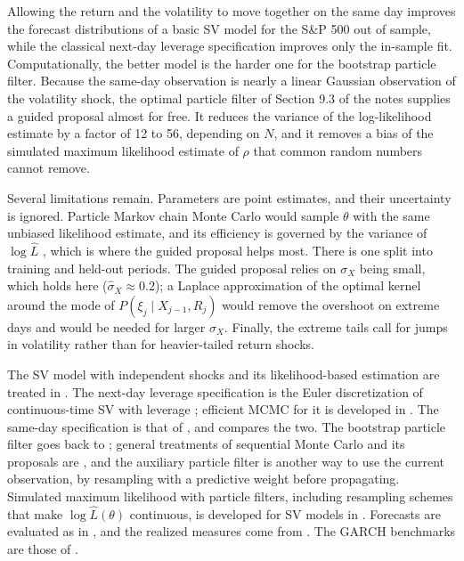 Allowing the return and the volatility to move together on the same day improves the forecast distributions of a basic SV model for the S\&P 500 out of sample, while the classical next-day leverage specification improves only the in-sample fit. Computationally, the better model is the harder one for the bootstrap particle filter. Because the same-day observation is nearly a linear Gaussian observation of the volatility shock, the optimal particle filter of Section 9.3 of the notes supplies a guided proposal almost for free. It reduces the variance of the log-likelihood estimate by a factor of 12 to 56, depending on $N$, and it removes a bias of the simulated maximum likelihood estimate of $\rho$ that common random numbers cannot remove.

Several limitations remain. Parameters are point estimates, and their uncertainty is ignored. Particle Markov chain Monte Carlo \cite{andrieuEtAl2010} would sample $\theta$ with the same unbiased likelihood estimate, and its efficiency is governed by the variance of $\log\hat L$ \cite{doucetEtAl2015}, which is where the guided proposal helps most. There is one split into training and held-out periods. The guided proposal relies on $\sigma_X$ being small, which holds here ($\hat\sigma_X \approx 0.2$); a Laplace approximation of the optimal kernel around the mode of $P(\xi_j \mid X_{j-1}, R_j)$ would remove the overshoot on extreme days and would be needed for larger $\sigma_X$. Finally, the extreme tails call for jumps in volatility rather than for heavier-tailed return shocks.

The SV model with independent shocks and its likelihood-based estimation are treated in \cite{kimShephardChib1998}. The next-day leverage specification is the Euler discretization of continuous-time SV with leverage \cite{harveyShephard1996, yu2005}; efficient MCMC for it is developed in \cite{omoriEtAl2007}. The same-day specification is that of \cite{jacquierPolsonRossi2004}, and \cite{yu2005} compares the two. The bootstrap particle filter goes back to \cite{gordonEtAl1993}; general treatments of sequential Monte Carlo and its proposals are \cite{doucetGodsillAndrieu2000, delMoral2004, chopinPapaspiliopoulos2020}, and the auxiliary particle filter \cite{pittShephard1999} is another way to use the current observation, by resampling with a predictive weight before propagating. Simulated maximum likelihood with particle filters, including resampling schemes that make $\log\hat L(\theta)$ continuous, is developed for SV models in \cite{malikPitt2011, pittMalikDoucet2014}. Forecasts are evaluated as in \cite{dieboldMariano1995, dieboldGuntherTay1998, patton2011}, and the realized measures come from \cite{heberEtAl2009}. The GARCH benchmarks are those of \cite{bollerslev1986, glostenEtAl1993}.
